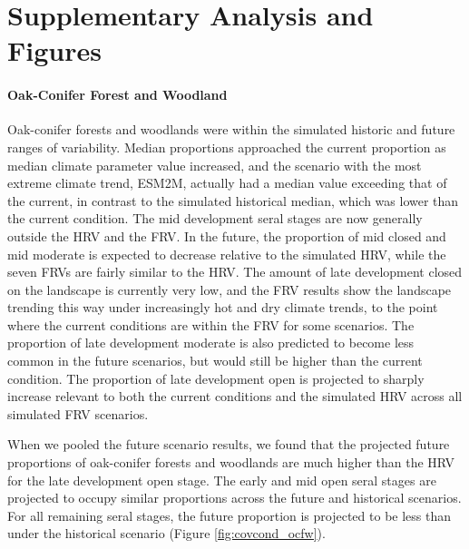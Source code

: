 \appendix

\section{Supplementary Analysis and Figures}
\label{app:futurecovcond}

\paragraph{Oak-Conifer Forest and Woodland} Oak-conifer forests and woodlands were within the simulated historic and future ranges of variability. Median proportions approached the current proportion as median climate parameter value increased, and the scenario with the most extreme climate trend, ESM2M, actually had a median value exceeding that of the current, in contrast to the simulated historical median, which was lower than the current condition. The mid development seral stages are now generally outside the HRV and the FRV. In the future, the proportion of mid closed and mid moderate is expected to decrease relative to the simulated HRV, while the seven FRVs are fairly similar to the HRV. The amount of late development closed on the landscape is currently very low, and the FRV results show the landscape trending this way under increasingly hot and dry climate trends, to the point where the current conditions are within the FRV for some scenarios. The proportion of late development moderate is also predicted to become less common in the future scenarios, but would still be higher than the current condition. The proportion of late development open is projected to sharply increase relevant to both the current conditions and the simulated HRV across all simulated FRV scenarios.

When we pooled the future scenario results, we found that the projected future proportions of oak-conifer forests and woodlands are much higher than the HRV for the late development open stage. The early and mid open seral stages are projected to occupy similar proportions across the future and historical scenarios. For all remaining seral stages, the future proportion is projected to be less than under the historical scenario (Figure \ref{fig:covcond_ocfw}).

